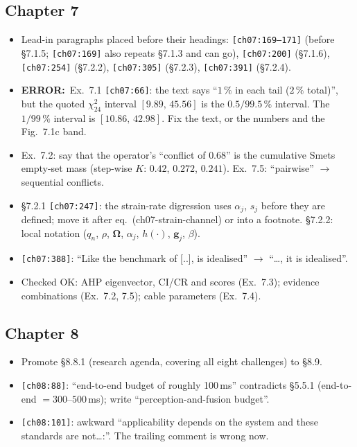 \documentclass[10pt,a4paper]{article}
\newcommand{\src}[1]{{\footnotesize\texttt{[#1]}}}
\newcommand{\err}{\textbf{ERROR:}~}
\begin{document}
\subsection*{Chapter 7}
\begin{itemize}
\item Lead-in paragraphs placed before their headings: \src{ch07:169--171} (before \S7.1.5; \src{ch07:169} also repeats \S7.1.3 and can go), \src{ch07:200} (\S7.1.6), \src{ch07:254} (\S7.2.2), \src{ch07:305} (\S7.2.3), \src{ch07:391} (\S7.2.4).
\item \err Ex.~7.1 \src{ch07:66}: the text says ``$1\,\%$ in each tail ($2\,\%$ total)'', but the quoted $\chi^2_{24}$ interval $[9.89,\,45.56]$ is the $0.5/99.5\,\%$ interval. The $1/99\,\%$ interval is $[10.86,\,42.98]$. Fix the text, or the numbers and the Fig.~7.1c band.
\item Ex.~7.2: say that the operator's ``conflict of $0.68$'' is the cumulative Smets empty-set mass (step-wise $K$: $0.42$, $0.272$, $0.241$). Ex.~7.5: ``pairwise'' $\to$ sequential conflicts.
\item \S7.2.1 \src{ch07:247}: the strain-rate digression uses $\alpha_j$, $s_j$ before they are defined; move it after eq.~(ch07-strain-channel) or into a footnote. \S7.2.2: local notation ($q_n$, $\rho$, $\boldsymbol\Omega$, $\alpha_j$, $h(\cdot)$, $\mathbf{g}_j$, $\beta$).
\item \src{ch07:388}: ``Like the benchmark of [..], is idealised'' $\to$ ``\ldots, it is idealised''.
\item Checked OK: AHP eigenvector, CI/CR and scores (Ex.~7.3); evidence combinations (Ex.~7.2, 7.5); cable parameters (Ex.~7.4).
\end{itemize}

\subsection*{Chapter 8}
\begin{itemize}
\item Promote \S8.8.1 (research agenda, covering all eight challenges) to \S8.9.
\item \src{ch08:88}: ``end-to-end budget of roughly 100\,ms'' contradicts \S5.5.1 (end-to-end $=300$--$500$\,ms); write ``perception-and-fusion budget''.
\item \src{ch08:101}: awkward ``applicability depends on the system and these standards are not\ldots:''. The trailing comment is wrong now.
\end{itemize}
\end{document}

